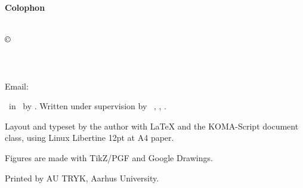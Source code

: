 \documentclass[../main.tex]{subfiles} %
\begin{document}
\clearpage %

\thispagestyle{empty} %

\vspace*{\fill} %

\begin{center} %
    \textbf{\textsf{Colophon}} %
\end{center}
\vspace{1em} %

\noindent %
\textsl{\Title}\\

\noindent
$\copyright$ \Year\ \Author\\
\Department\\
\University\\
\DepartmentAddress\\
Email: \AuthorEmail \vspace{1.5em} %



\noindent %
\Doctype\ in \MakeLowercase{\SubjectOfStudy}\ by \Author. Written under supervision by \SupervisorTitle\ \Supervisor, \Department, \University.
\vspace{.5em} %

\noindent %
Layout and typeset by the author with LaTeX and the KOMA-Script document class, using Linux Libertine 12pt at A4 paper.
\vspace{.5em} %

\noindent %
Figures are made with TikZ/PGF and Google Drawings.
\vspace{.5em} %

\noindent %
Printed by AU TRYK, Aarhus University.

\end{document}
